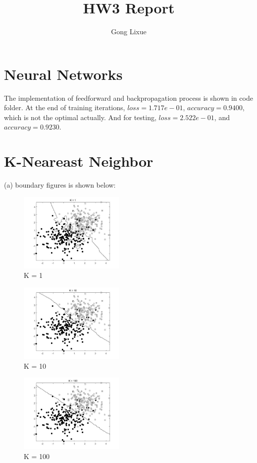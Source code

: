 \documentclass[11pt]{article} %
\title{HW3 Report}
\author{Gong Lixue}
\begin{document}
\maketitle

\section{Neural Networks}

The implementation of feedforward and backpropagation process is shown in code folder.
At the end of training iterations, $ loss = 1.717e-01 $, $ accuracy = 0.9400 $, which is not the optimal actually.
And for testing, $ loss = 2.522e-01 $, and $accuracy=0.9230$.

\section{K-Neareast Neighbor}
(a) boundary figures is shown below:

\begin{figure}[h]
\centering
\includegraphics[width=2in]{knn_k1.jpg}  %
\caption{K = 1}
\label{fig1}
\end{figure}

\begin{figure}[h]
\centering
\includegraphics[width=2in]{knn_k10.jpg}  %
\caption{K = 10}
\label{fig2}
\end{figure}

\begin{figure}[h]
\centering
\includegraphics[width=2in]{knn_k100.jpg}  %
\caption{K = 100}
\label{fig3}
\end{figure}
\end{document}
